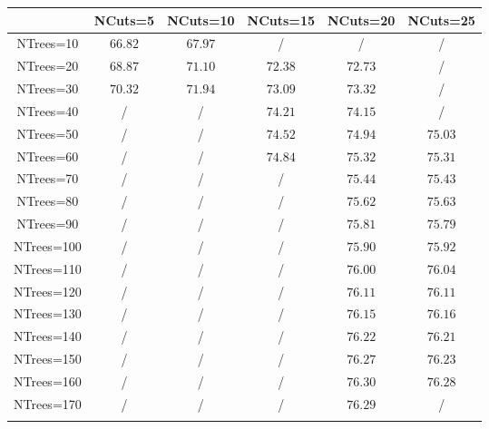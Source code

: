 \centering
\begin{tabular}{cccccc} \toprule\toprule
 & NCuts=5 & NCuts=10 & NCuts=15 & NCuts=20 & NCuts=25\\\midrule
NTrees=10 & $66.82$ & $67.97$ &  / &  / &  /\\
NTrees=20 & $68.87$ & $71.10$ & $72.38$ & $72.73$ &  /\\
NTrees=30 & $70.32$ & $71.94$ & $73.09$ & $73.32$ &  /\\
NTrees=40 &  / &  / & $74.21$ & $74.15$ &  /\\
NTrees=50 &  / &  / & $74.52$ & $74.94$ & $75.03$\\
NTrees=60 &  / &  / & $74.84$ & $75.32$ & $75.31$\\
NTrees=70 &  / &  / &  / & $75.44$ & $75.43$\\
NTrees=80 &  / &  / &  / & $75.62$ & $75.63$\\
NTrees=90 &  / &  / &  / & $75.81$ & $75.79$\\
NTrees=100 &  / &  / &  / & $75.90$ & $75.92$\\
NTrees=110 &  / &  / &  / & $76.00$ & $76.04$\\
NTrees=120 &  / &  / &  / & $76.11$ & $76.11$\\
NTrees=130 &  / &  / &  / & $76.15$ & $76.16$\\
NTrees=140 &  / &  / &  / & $76.22$ & $76.21$\\
NTrees=150 &  / &  / &  / & $76.27$ & $76.23$\\
NTrees=160 &  / &  / &  / & $76.30$ & $76.28$\\
NTrees=170 &  / &  / &  / & $76.29$ &  /\\
\bottomrule\bottomrule\\
\end{tabular}
